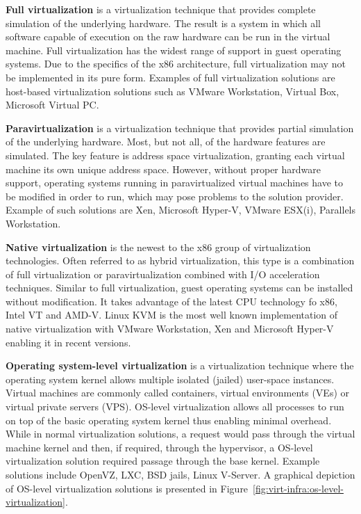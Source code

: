 \textbf{Full virtualization} is a virtualization technique that provides
complete simulation of the underlying hardware. The result is a system in
which all software capable of execution on the raw hardware can be run in the
virtual machine. Full virtualization has the widest range of support in guest
operating systems. Due to the specifics of the x86 architecture, full
virtualization may not be implemented in its pure form. Examples of
full virtualization solutions are host-based virtualization solutions such as
VMware Workstation, Virtual Box, Microsoft Virtual PC.

\textbf{Paravirtualization} is a virtualization technique that provides
partial simulation of the underlying hardware. Most, but not all, of the
hardware features are simulated. The key feature is address space
virtualization, granting each virtual machine its own unique address space.
However, without proper hardware support, operating systems running in
paravirtualized virtual machines have to be modified in order to run, which
may pose problems to the solution provider. Example of such solutions are Xen,
Microsoft Hyper-V, VMware ESX(i), Parallels Workstation.

\textbf{Native virtualization} is the newest to the x86 group of
virtualization technologies. Often referred to as hybrid virtualization, this
type is a combination of full virtualization or paravirtualization combined
with I/O acceleration techniques. Similar to full virtualization, guest
operating systems can be installed without modification. It takes advantage of
the latest CPU technology fo x86, Intel VT and AMD-V. Linux KVM is the most
well known implementation of native virtualization with VMware Workstation,
Xen and Microsoft Hyper-V enabling it in recent versions.

\textbf{Operating system-level virtualization} is a virtualization technique
where the operating system kernel allows multiple isolated (jailed) user-space
instances. Virtual machines are commonly called containers, virtual
environments (VEs) or virtual private servers (VPS). OS-level virtualization
allows all processes to run on top of the basic operating system kernel thus
enabling minimal overhead. While in normal virtualization solutions, a request
would pass through the virtual machine kernel and then, if required, through
the hypervisor, a OS-level virtualization solution required passage through
the base kernel. Example solutions include OpenVZ, LXC, BSD jails, Linux
V-Server. A graphical depiction of OS-level virtualization solutions is
presented in Figure~\ref{fig:virt-infra:os-level-virtualization}.

